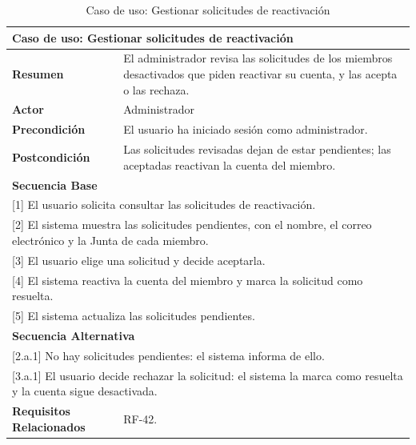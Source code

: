 \begin{table}[h!]
    \centering
    \renewcommand{\arraystretch}{1.5}

    \begin{tabular}{|p{4cm}|p{11cm}|}
        \hline
        \multicolumn{2}{|l|}{\textbf{Caso de uso: Gestionar solicitudes de reactivación}} \\
        \hline
        \textbf{Resumen} & El administrador revisa las solicitudes de los miembros desactivados que piden reactivar su cuenta, y las acepta o las rechaza. \\
        \hline
        \textbf{Actor} & Administrador \\
        \hline
        \textbf{Precondición} & El usuario ha iniciado sesión como administrador. \\
        \hline
        \textbf{Postcondición} & Las solicitudes revisadas dejan de estar pendientes; las aceptadas reactivan la cuenta del miembro. \\
        \hline
        \multicolumn{2}{|l|}{\textbf{Secuencia Base}} \\
        \hline
        \multicolumn{2}{|p{15cm}|}{ [1] El usuario solicita consultar las solicitudes de reactivación. } \\
        \hline
        \multicolumn{2}{|p{15cm}|}{ [2] El sistema muestra las solicitudes pendientes, con el nombre, el correo electrónico y la Junta de cada miembro. } \\
        \hline
        \multicolumn{2}{|p{15cm}|}{ [3] El usuario elige una solicitud y decide aceptarla. } \\
        \hline
        \multicolumn{2}{|p{15cm}|}{ [4] El sistema reactiva la cuenta del miembro y marca la solicitud como resuelta. } \\
        \hline
        \multicolumn{2}{|p{15cm}|}{ [5] El sistema actualiza las solicitudes pendientes. } \\
        \hline
        \multicolumn{2}{|l|}{\textbf{Secuencia Alternativa}} \\
        \hline
        \multicolumn{2}{|p{15cm}|}{ [2.a.1] No hay solicitudes pendientes: el sistema informa de ello. } \\
        \hline
        \multicolumn{2}{|p{15cm}|}{ [3.a.1] El usuario decide rechazar la solicitud: el sistema la marca como resuelta y la cuenta sigue desactivada. } \\
        \hline
        \textbf{Requisitos Relacionados} & RF-42. \\
        \hline
    \end{tabular}
    \caption{Caso de uso: Gestionar solicitudes de reactivación}
\end{table}
